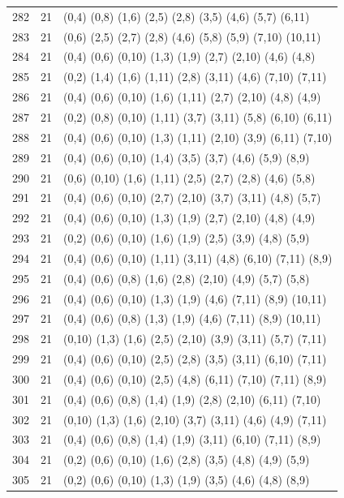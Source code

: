 {\begin{longtable}{lll}
282 & 21 & (0,4) (0,8) (1,6) (2,5) (2,8) (3,5) (4,6) (5,7) (6,11) \\
283 & 21 & (0,6) (2,5) (2,7) (2,8) (4,6) (5,8) (5,9) (7,10) (10,11) \\
284 & 21 & (0,4) (0,6) (0,10) (1,3) (1,9) (2,7) (2,10) (4,6) (4,8) \\
285 & 21 & (0,2) (1,4) (1,6) (1,11) (2,8) (3,11) (4,6) (7,10) (7,11) \\
286 & 21 & (0,4) (0,6) (0,10) (1,6) (1,11) (2,7) (2,10) (4,8) (4,9) \\
287 & 21 & (0,2) (0,8) (0,10) (1,11) (3,7) (3,11) (5,8) (6,10) (6,11) \\
288 & 21 & (0,4) (0,6) (0,10) (1,3) (1,11) (2,10) (3,9) (6,11) (7,10) \\
289 & 21 & (0,4) (0,6) (0,10) (1,4) (3,5) (3,7) (4,6) (5,9) (8,9) \\
290 & 21 & (0,6) (0,10) (1,6) (1,11) (2,5) (2,7) (2,8) (4,6) (5,8) \\
291 & 21 & (0,4) (0,6) (0,10) (2,7) (2,10) (3,7) (3,11) (4,8) (5,7) \\
292 & 21 & (0,4) (0,6) (0,10) (1,3) (1,9) (2,7) (2,10) (4,8) (4,9) \\
293 & 21 & (0,2) (0,6) (0,10) (1,6) (1,9) (2,5) (3,9) (4,8) (5,9) \\
294 & 21 & (0,4) (0,6) (0,10) (1,11) (3,11) (4,8) (6,10) (7,11) (8,9) \\
295 & 21 & (0,4) (0,6) (0,8) (1,6) (2,8) (2,10) (4,9) (5,7) (5,8) \\
296 & 21 & (0,4) (0,6) (0,10) (1,3) (1,9) (4,6) (7,11) (8,9) (10,11) \\
297 & 21 & (0,4) (0,6) (0,8) (1,3) (1,9) (4,6) (7,11) (8,9) (10,11) \\
298 & 21 & (0,10) (1,3) (1,6) (2,5) (2,10) (3,9) (3,11) (5,7) (7,11) \\
299 & 21 & (0,4) (0,6) (0,10) (2,5) (2,8) (3,5) (3,11) (6,10) (7,11) \\
300 & 21 & (0,4) (0,6) (0,10) (2,5) (4,8) (6,11) (7,10) (7,11) (8,9) \\
301 & 21 & (0,4) (0,6) (0,8) (1,4) (1,9) (2,8) (2,10) (6,11) (7,10) \\
302 & 21 & (0,10) (1,3) (1,6) (2,10) (3,7) (3,11) (4,6) (4,9) (7,11) \\
303 & 21 & (0,4) (0,6) (0,8) (1,4) (1,9) (3,11) (6,10) (7,11) (8,9) \\
304 & 21 & (0,2) (0,6) (0,10) (1,6) (2,8) (3,5) (4,8) (4,9) (5,9) \\
305 & 21 & (0,2) (0,6) (0,10) (1,3) (1,9) (3,5) (4,6) (4,8) (8,9) \\

\end{longtable}}
